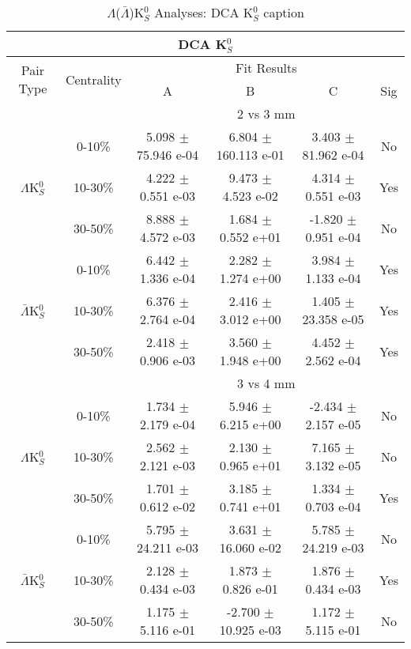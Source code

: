 \documentclass[../AnalysisNoteJBuxton.tex]{subfiles}
\begin{document}
\begin{table}
 \centering
 \begin{tabular}{|c|c|c|c|c|c|}
  \multicolumn{6}{c}{DCA K$^{0}_{S}$} \\
  \hline
  \multirow{2}{*}{Pair Type} & \multirow{2}{*}{Centrality} & \multicolumn{4}{c|}{Fit Results} \\
  \cline{3-6}
   & & A & B & C & Sig \\  
  \hline
  \multicolumn{2}{|c}{} & \multicolumn{4}{c|}{2 vs 3 mm} \\  
  \hline  
  \multirow{3}{*}{$\Lambda$K$^{0}_{S}$}
   &  0-10\% & 5.098 $\pm$ 75.946 e-04 & 6.804 $\pm$ 160.113 e-01 & 3.403 $\pm$ 81.962 e-04 & No \\
   & 10-30\% & 4.222 $\pm$ 0.551 e-03 & 9.473 $\pm$ 4.523 e-02 & 4.314 $\pm$ 0.551 e-03 & Yes \\
   & 30-50\% & 8.888 $\pm$ 4.572 e-03 & 1.684 $\pm$ 0.552 e+01 & -1.820 $\pm$ 0.951 e-04 & No \\
  \hline
  \multirow{3}{*}{$\bar{\Lambda}$K$^{0}_{S}$}  
   &  0-10\% & 6.442 $\pm$ 1.336 e-04 & 2.282 $\pm$ 1.274 e+00 & 3.984 $\pm$ 1.133 e-04 & Yes \\
   & 10-30\% & 6.376 $\pm$ 2.764 e-04 & 2.416 $\pm$ 3.012 e+00 & 1.405 $\pm$ 23.358 e-05 & Yes \\
   & 30-50\% & 2.418 $\pm$ 0.906 e-03 & 3.560 $\pm$ 1.948 e+00 & 4.452 $\pm$ 2.562 e-04 & Yes \\
  \hline 
  \multicolumn{2}{|c}{} & \multicolumn{4}{c|}{3 vs 4 mm} \\
  \hline  
  \multirow{3}{*}{$\Lambda$K$^{0}_{S}$}   
   &  0-10\% & 1.734 $\pm$ 2.179 e-04 & 5.946 $\pm$ 6.215 e+00 & -2.434 $\pm$ 2.157 e-05 & No \\
   & 10-30\% & 2.562 $\pm$ 2.121 e-03 & 2.130 $\pm$ 0.965 e+01 & 7.165 $\pm$ 3.132 e-05 & No \\
   & 30-50\% & 1.701 $\pm$ 0.612 e-02 & 3.185 $\pm$ 0.741 e+01 & 1.334 $\pm$ 0.703 e-04 & Yes \\
  \hline  
  \multirow{3}{*}{$\bar{\Lambda}$K$^{0}_{S}$}
   &  0-10\% & 5.795 $\pm$ 24.211 e-03 & 3.631 $\pm$ 16.060 e-02 & 5.785 $\pm$ 24.219 e-03 & No \\
   & 10-30\% & 2.128 $\pm$ 0.434 e-03 & 1.873 $\pm$ 0.826 e-01 & 1.876 $\pm$ 0.434 e-03 & Yes \\
   & 30-50\% & 1.175 $\pm$ 5.116 e-01 & -2.700 $\pm$ 10.925 e-03 & 1.172 $\pm$ 5.115 e-01 & No \\
  \hline
 \end{tabular}
 \caption{$\Lambda$($\bar{\Lambda}$)K$^{0}_{S}$ Analyses: DCA K$^{0}_{S}$ caption}
 \label{tab:K0DcaLamK0Full}
\end{table}
\end{document}
